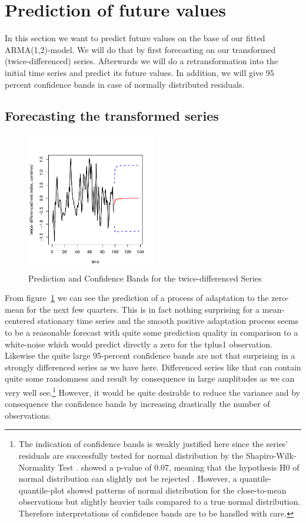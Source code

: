 \documentclass[11pt,a4paper]{article}
\begin{document}
\section{Prediction of future values}
In this section we want to predict future values on the base of our fitted ARMA(1,2)-model. We will do that by first forecasting on our transformed (twice-differenced) series. Afterwards we will do a retransformation into the initial time series and predict its future values. In addition, we will give 95 percent confidence bands in case of normally distributed residuals.
\subsection{Forecasting the transformed series}

\begin{figure}[!ht]
\centering
\includegraphics[angle=0,
width=0.5\textwidth]{pred_transformed_series}
\caption{Prediction and Confidence Bands for the twice-differenced Series
\label{fig:pred_transformed_series}}
\end{figure}

From figure~\ref{fig:pred_transformed_series} we can see the prediction of a process of adaptation to the zero-mean for the next few quarters. This is in fact nothing surprising for a mean-centered stationary time series and the smooth positive adaptation process seems to be a reasonable forecast with quite some prediction quality in comparison to a white-noise which would predict directly a zero for the tplus1 observation. 
Likewise the quite large 95-percent confidence bands are not that surprising in a strongly differenced series as we have here. Differenced series like that can contain quite some randomness and result by consequence in large amplitudes as we can very well see.\footnote{The indication of confidence bands is weakly justified here since the series’ residuals are successfully tested for normal distribution by the Shapiro-Wilk-Normality Test . showed a p-value of 0.07, meaning that the hypothesis H0 of normal distribution can slightly not be rejected \citep{shapiro}. However, a quantile-quantile-plot showed patterns of normal distribution for the close-to-mean observations but slightly heavier tails compared to a true normal distribution. Therefore interpretations of confidence bands are to be handled with care.}
However, it would be quite desirable to reduce the variance and by consequence  the confidence bands by increasing drastically the number of observations.
\end{document}
